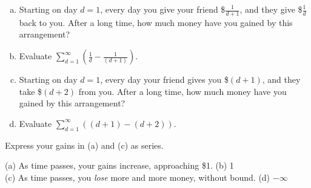 \begin{question}
\begin{enumerate}[(a)]
\item Starting on day $d=1$, every day you give your friend \$$\frac{1}{d+1}$, and they give \$$\frac{1}{d}$ back to you.  After a long time, how much money have you gained by this arrangement?
\item Evaluate $\displaystyle\sum_{d=1}^\infty \left(\frac{1}{d}-\frac{1}{(d+1)}\right)$.
\item Starting on day $d=1$, every day your friend gives you \$$(d+1)$, and they take \$$(d+2)$ from you.  After a long time, how much money have you gained by this arrangement?
\item Evaluate $\displaystyle\sum_{d=1}^\infty \left((d+1)-(d+2)\right)$.
\end{enumerate}
\end{question}
\begin{hint}
Express your gains in (a) and (c) as series.
\end{hint}
\begin{answer}
(a) As time passes, your gains increase, approaching \$1.
\qquad (b) 1\\
(c) As time passes, you \emph{lose} more and more money, without bound.\qquad
(d) $-\infty$
\end{answer}
